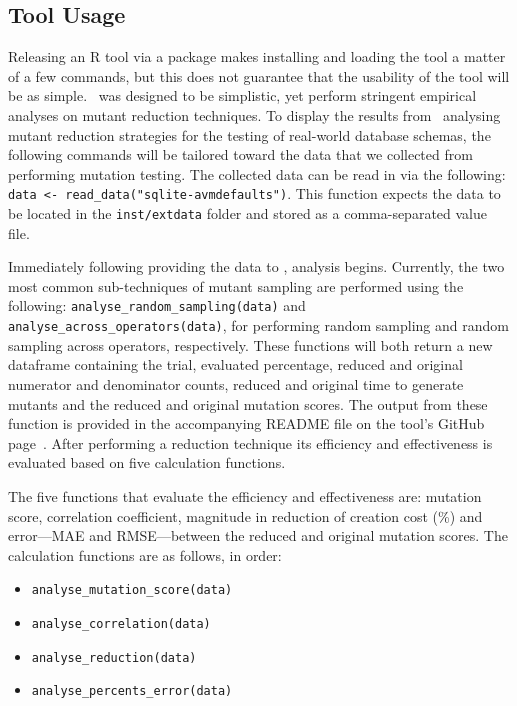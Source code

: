 \subsection{Tool Usage}

Releasing an R tool via a package makes installing and loading the tool
a matter of a few commands, but this does not guarantee that the usability
of the tool will be as simple. \mr~was designed to be simplistic,
yet perform stringent empirical analyses on mutant reduction techniques.
To display the results from \mr~analysing mutant reduction strategies for the
testing of real-world database schemas, the following commands will be tailored
toward the data that we collected from performing mutation testing.
The collected data can be read in via the following: {\small\texttt{data <- read\_data("sqlite-avmdefaults")}}.
This function expects the data to be located in the \texttt{inst/extdata} folder
and stored as a comma-separated value file.

Immediately following providing the data to \mr, analysis begins. Currently,
the two most common sub-techniques of mutant sampling are performed using the following:
\texttt{analyse\_random\_sampling(data)} and \texttt{analyse\_across\_operators(data)},
for performing random sampling and random sampling across operators, respectively.
These functions will both return a new dataframe containing the trial, evaluated
percentage, reduced and original numerator and denominator counts,
reduced and original time to generate mutants and the reduced and original mutation scores.
The output from these function is provided in the accompanying README file on the
tool's GitHub page~\cite{tool}. After performing a reduction technique its efficiency
and effectiveness is evaluated based on five calculation functions.

The five functions that evaluate the efficiency and effectiveness are:
mutation score, correlation coefficient, magnitude in reduction of creation cost
(\%) and error---MAE and RMSE---between the reduced and original mutation scores.
The calculation functions are as follows, in order:

\begin{itemize}
    \item {\small\texttt{analyse\_mutation\_score(data)}}
    \item {\small\texttt{analyse\_correlation(data)}}
    \item {\small\texttt{analyse\_reduction(data)}}
    \item {\small\texttt{analyse\_percents\_error(data)}}
\end{itemize}

